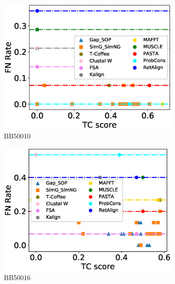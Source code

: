 \begin{figure}[!htbp]
\begin{adjustwidth}{-1cm}{-1cm}
\begin{subfigure}{0.22\textwidth}
			\includegraphics[width=\columnwidth]{Figure/summary/precomputedInit/Balibase/BB50010_fnrate_vs_tc_2}
			\caption{BB50010}
		\end{subfigure}
		\begin{subfigure}{0.22\textwidth}
			\includegraphics[width=\columnwidth]{Figure/summary/precomputedInit/Balibase/BB50016_fnrate_vs_tc_2}
			\caption{BB50016}
		\end{subfigure}	
		\begin{subfigure}{0.22\textwidth}

\end{subfigure}
\end{adjustwidth}
\end{figure}
